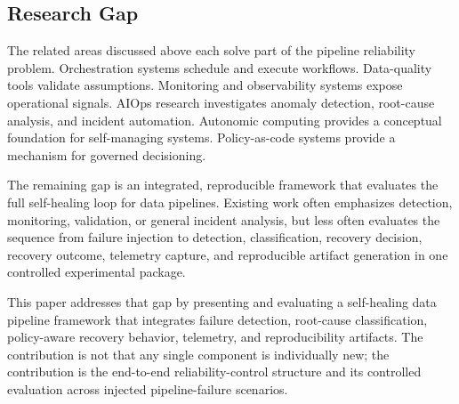 \subsection{Research Gap}

The related areas discussed above each solve part of the pipeline reliability problem. Orchestration systems schedule and execute workflows. Data-quality tools validate assumptions. Monitoring and observability systems expose operational signals. AIOps research investigates anomaly detection, root-cause analysis, and incident automation. Autonomic computing provides a conceptual foundation for self-managing systems. Policy-as-code systems provide a mechanism for governed decisioning.

The remaining gap is an integrated, reproducible framework that evaluates the full self-healing loop for data pipelines. Existing work often emphasizes detection, monitoring, validation, or general incident analysis, but less often evaluates the sequence from failure injection to detection, classification, recovery decision, recovery outcome, telemetry capture, and reproducible artifact generation in one controlled experimental package.

This paper addresses that gap by presenting and evaluating a self-healing data pipeline framework that integrates failure detection, root-cause classification, policy-aware recovery behavior, telemetry, and reproducibility artifacts. The contribution is not that any single component is individually new; the contribution is the end-to-end reliability-control structure and its controlled evaluation across injected pipeline-failure scenarios.

